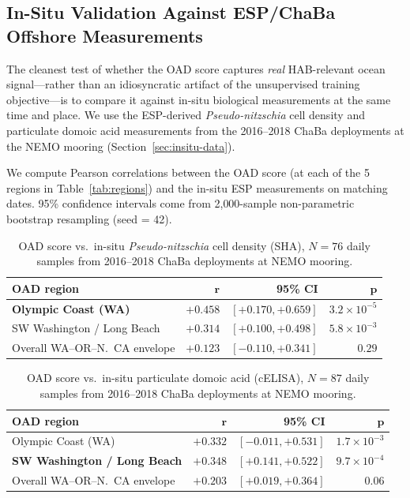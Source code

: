 \documentclass[toxins,article,submit,moreauthors]{Definitions/mdpi}
\begin{document}
\subsection{In-Situ Validation Against ESP/ChaBa Offshore Measurements}
\label{sec:results-esp}

The cleanest test of whether the OAD score captures \emph{real} HAB-relevant ocean signal---rather than an idiosyncratic artifact of the unsupervised training objective---is to compare it against in-situ biological measurements at the same time and place. We use the ESP-derived \textit{Pseudo-nitzschia} cell density and particulate domoic acid measurements from the 2016--2018 ChaBa deployments at the NEMO mooring (Section~\ref{sec:insitu-data}).

We compute Pearson correlations between the OAD score (at each of the 5 regions in Table~\ref{tab:regions}) and the in-situ ESP measurements on matching dates. 95\% confidence intervals come from 2{,}000-sample non-parametric bootstrap resampling (seed = 42).

\begin{table}[H]
\caption{OAD score vs.\ in-situ \textit{Pseudo-nitzschia} cell density (SHA), $N = 76$ daily samples from 2016--2018 ChaBa deployments at NEMO mooring.}
\label{tab:esp-pn}
\centering\small
\begin{tabular}{lrrr}
\toprule
\textbf{OAD region} & $\boldsymbol{r}$ & \textbf{95\% CI} & $\boldsymbol{p}$ \\
\midrule
\textbf{Olympic Coast (WA)} & $\boldsymbol{+0.458}$ & $[+0.170, +0.659]$ & $3.2 \times 10^{-5}$ \\
SW Washington / Long Beach & $+0.314$ & $[+0.100, +0.498]$ & $5.8 \times 10^{-3}$ \\
Overall WA--OR--N.\ CA envelope & $+0.123$ & $[-0.110, +0.341]$ & $0.29$ \\
\bottomrule
\end{tabular}
\end{table}

\begin{table}[H]
\caption{OAD score vs.\ in-situ particulate domoic acid (cELISA), $N = 87$ daily samples from 2016--2018 ChaBa deployments at NEMO mooring.}
\label{tab:esp-pda}
\centering\small
\begin{tabular}{lrrr}
\toprule
\textbf{OAD region} & $\boldsymbol{r}$ & \textbf{95\% CI} & $\boldsymbol{p}$ \\
\midrule
Olympic Coast (WA) & $+0.332$ & $[-0.011, +0.531]$ & $1.7 \times 10^{-3}$ \\
\textbf{SW Washington / Long Beach} & $\boldsymbol{+0.348}$ & $[+0.141, +0.522]$ & $9.7 \times 10^{-4}$ \\
Overall WA--OR--N.\ CA envelope & $+0.203$ & $[+0.019, +0.364]$ & $0.06$ \\
\bottomrule
\end{tabular}
\end{table}
\end{document}
